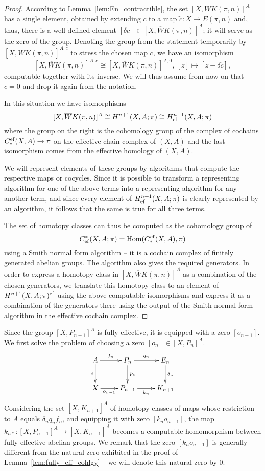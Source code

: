 \documentclass[12pt,a4wide]{article}
\theoremstyle{plain}
\theoremstyle{definition}
\newcommand{\heading}[1]{\vspace{1ex}\par\noindent{\bf\boldmath #1}}
\newcommand{\Engen}{WK(\pi,\then)}
\newcommand{\Kngen}{\overline WK(\pi,\then)}
\newcommand{\then}{n}
\newcommand{\thedim}{{n}}
\newcommand{\Pnew}{{P_\thedim}}
\newcommand{\Pold}{{P_{\thedim-1}}}
\newcommand{\Kn}{{K_{\thedim+1}}}
\newcommand{\En}{{E_\thedim}}
\newcommand{\kn}{{k_\thedim}}
\newcommand{\knst}{{k_{\thedim*}}}
\newcommand{\pn}{{p_\thedim}}
\newcommand{\qn}{{q_\thedim}}
\renewcommand\:{\colon}
\newcommand{\onmo}{{o_{n-1}}}
\newcommand{\deltan}{{\delta_n}}
\newcommand{\fn}{{f_\thedim}}
\begin{document}
\begin{proof}
According to Lemma~\ref{lem:En_contractible}, the set $[X, \Engen]^A$ has a single element, obtained by extending $c$ to a map $\widetilde c \colon X \to E(\pi, n)$ and, thus, there is a well defined element $[\delta \widetilde c] \in [X, \Kngen]^A$; it will serve as the zero of the group. Denoting the group from the statement temporarily by $[X, \Kngen]^{A, c}$ to stress the chosen map $c$, we have an isomorphism
\[[X, \Kngen]^{A, c} \cong [X, \Kngen]^{A, 0} ,\, [z] \mapsto [z - \delta \widetilde c],\]computable together with its inverse. We will thus assume from now on that $c=0$ and drop it again from the notation.

In this situation we have isomorphisms
\[[X, \Kngen]^A \cong H^{n+1}(X,A;\pi) \cong H^{n+1}_\ef(X,A;\pi)\]
where the group on the right is the cohomology group of the complex of cochains $C_*^{\mathop\mathrm{ef}\nolimits}(X,A)\to\pi$ on the effective chain complex of $(X,A)$ and the last isomorphism comes from the effective homology of $(X,A)$.

We will represent elements of these groups by algorithms that compute the respective maps or cocycles. Since it is possible to transform a representing algorithm for one of the above terms into a representing algorithm for any another term, and since every element of $H^{n+1}_{\mathop\mathrm{ef}\nolimits}(X,A;\pi)$ is clearly represented by an algorithm, it follows that the same is true for all three terms.

The set of homotopy classes can thus be computed as the cohomology group of
\[C^*_{\mathop\mathrm{ef}\nolimits}(X,A;\pi)=\operatorname{Hom}(C_*^{\mathop\mathrm{ef}\nolimits}(X,A),\pi)\]
using a Smith normal form algorithm -- it is a cochain complex of finitely generated abelian groups. The algorithm also gives the required generators. In order to express a homotopy class in $[X, \Kngen]^A$ as a combination of the chosen generators, we translate this homotopy class to an element of $H^{n+1}(X, A; \pi)^{\mathop\mathrm{ef}\nolimits}$ using the above computable isomorphisms and express it as a combination of the generators there using the output of the Smith normal form algorithm in the effective cochain complex.
\end{proof}

\heading{Computing the basepoint of $\boldsymbol{[X, \Pnew]^{A}}$}

Since the group $[X, \Pold]^A$ is fully effective, it is equipped with a zero $[o_{n-1}]$. We first solve the problem of choosing a zero $[o_n] \in [X, \Pnew]^A$.
\[\xymatrix{
A \ar[r]^-{\fn} \ar[d]_-{i} & \Pnew \ar[r]^-{\qn} \ar[d]^-{\pn} & \En \ar[d]^-{\deltan} \\
X \ar[r]_-{\onmo} & \Pold \ar[r]_-{\kn} & \Kn
}\]
Considering the set $[X, \Kn]^A$ of homotopy classes of maps whose restriction to $A$ equals $\deltan \qn \fn$, and equipping it with zero $[\kn\onmo]$, the map $\knst \colon [X, \Pold]^A \to [X, \Kn]^A$ becomes a computable homomorphism between fully effective abelian groups. We remark that the zero $[\kn\onmo]$ is generally different from the natural zero exhibited in the proof of Lemma~\ref{lem:fully_eff_cohlgy} -- we will denote this natural zero by $0$.
\end{document}
